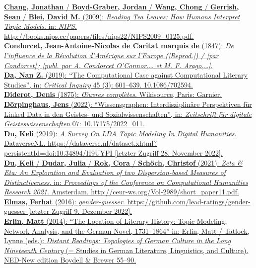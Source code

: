 \documentclass[
  12pt,
  letterpaper,
  DIV=11,
  numbers=noendperiod]{scrreprt}
\begin{document}
\href{https://www.zotero.org/google-docs/?fqBRoB}{\textbf{Chang,
Jonathan} / \textbf{Boyd-Graber, Jordan} / \textbf{Wang, Chong} /
\textbf{Gerrish, Sean} / \textbf{Blei, David M.} (2009): \emph{Reading
Tea Leaves: How Humans Interpret Topic Models}. in: \emph{NIPS}.
http://books.nips.cc/papers/files/nips22/NIPS2009\_0125.pdf.}\\
\href{https://www.zotero.org/google-docs/?fqBRoB}{\textbf{Condorcet,
Jean-Antoine-Nicolas de Caritat marquis de} (1847): \emph{De l'influence
de la Révolution d'Amérique sur l'Europe ({[}Reprod.{]}) / {[}par
Condorcet{]}\,; {[}publ. par A. Condorcet O'Connor,\ldots{} et M. F.
Arago,\ldots{]}}.}\\
\href{https://www.zotero.org/google-docs/?fqBRoB}{\textbf{Da, Nan Z.}
(2019): ``The Computational Case against Computational Literary
Studies'', in: \emph{Critical Inquiry} 45 (3): 601--639.
10.1086/702594.}\\
\href{https://www.zotero.org/google-docs/?fqBRoB}{\textbf{Diderot,
Denis} (1875): \emph{Œuvres complètes}. Wikisource, Paris: Garnier.}\\
\href{https://www.zotero.org/google-docs/?fqBRoB}{\textbf{Dörpinghaus,
Jens} (2022): ``Wissensgraphen: Interdisziplinäre Perspektiven für
Linked Data in den Geistes- und Sozialwissenschaften'', in:
\emph{Zeitschrift für digitale Geisteswissenschaften} 07:
10.17175/2022\_011.}\\
\href{https://www.zotero.org/google-docs/?fqBRoB}{\textbf{Du, Keli}
(2019): \emph{A Survey On LDA Topic Modeling In Digital Humanities}.
DataverseNL.
https://dataverse.nl/dataset.xhtml?persistentId=doi:10.34894/H9UYPI
{[}letzter Zugriff 28. November 2022{]}.}\\
\href{https://www.zotero.org/google-docs/?fqBRoB}{\textbf{Du, Keli} /
\textbf{Dudar, Julia} / \textbf{Rok, Cora} / \textbf{Schöch, Christof}
(2021): \emph{Zeta \& Eta: An Exploration and Evaluation of two
Dispersion-based Measures of Distinctiveness}. in: \emph{Proceedings of
the Conference on Computational Humanities Research 2021}. Amsterdam.
http://ceur-ws.org/Vol-2989/short\_paper11.pdf.}\\
\href{https://www.zotero.org/google-docs/?fqBRoB}{\textbf{Elmas, Ferhat}
(2016): \emph{gender-guesser}.
https://github.com/lead-ratings/gender-guesser {[}letzter Zugriff 9.
Dezember 2022{]}.}\\
\href{https://www.zotero.org/google-docs/?fqBRoB}{\textbf{Erlin, Matt}
(2014): ``The Location of Literary History: Topic Modeling, Network
Analysis, and the German Novel, 1731--1864'' in: Erlin, Matt / Tatlock,
Lynne (eds.): \emph{Distant Readings: Topologies of German Culture in
the Long Nineteenth Century} (= Studies in German Literature,
Linguistics, and Culture). NED-New edition Boydell \& Brewer 55--90.}\\
\end{document}
